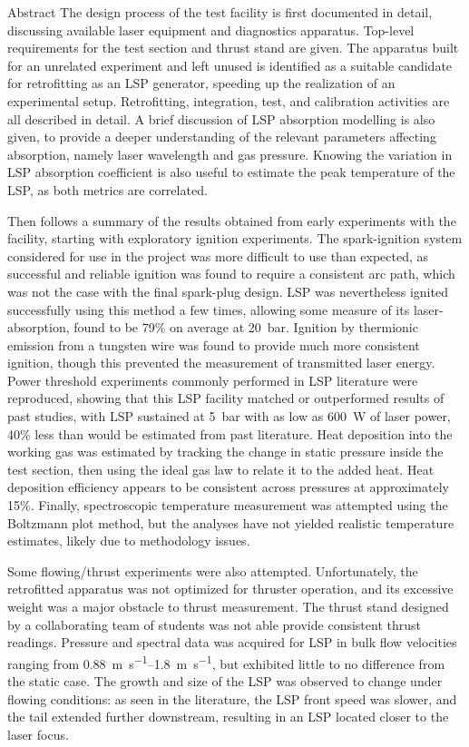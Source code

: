 \begin{plainchp}{Abstract}
    The design process of the test facility is first documented in detail, discussing available laser equipment and diagnostics apparatus. Top-level requirements for the test section and thrust stand are given. The apparatus built for an unrelated experiment and left unused is identified as a suitable candidate for retrofitting as an LSP generator, speeding up the realization of an experimental setup. Retrofitting, integration, test, and calibration activities are all described in detail. A brief discussion of LSP absorption modelling is also given, to provide a deeper understanding of the relevant parameters affecting absorption, namely laser wavelength and gas pressure. Knowing the variation in LSP absorption coefficient is also useful to estimate the peak temperature of the LSP, as both metrics are correlated.

    Then follows a summary of the results obtained from early experiments with the facility, starting with exploratory ignition experiments. The spark-ignition system considered for use in the project was more difficult to use than expected, as successful and reliable ignition was found to require a consistent arc path, which was not the case with the final spark-plug design. LSP was nevertheless ignited successfully using this method a few times, allowing some measure of its laser-absorption, found to be 79\% on average at \qty{20}{bar}. Ignition by thermionic emission from a tungsten wire was found to provide much more consistent ignition, though this prevented the measurement of transmitted laser energy. Power threshold experiments commonly performed in LSP literature were reproduced, showing that this LSP facility matched or outperformed results of past studies, with LSP sustained at \qty{5}{bar} with as low as \qty{600}{W} of laser power, 40\% less than would be estimated from past literature. Heat deposition into the working gas was estimated by tracking the change in static pressure inside the test section, then using the ideal gas law to relate it to the added heat. Heat deposition efficiency appears to be consistent across pressures at approximately 15\%. Finally, spectroscopic temperature measurement was attempted using the Boltzmann plot method, but the analyses have not yielded realistic temperature estimates, likely due to methodology issues.

    Some flowing/thrust experiments were also attempted. Unfortunately, the retrofitted apparatus was not optimized for thruster operation, and its excessive weight was a major obstacle to thrust measurement. The thrust stand designed by a collaborating team of students was not able provide consistent thrust readings. Pressure and spectral data was acquired for LSP in bulk flow velocities ranging from \qtyrange{0.88}{1.8}{m.s^{-1}}, but exhibited little to no difference from the static case. The growth and size of the LSP was observed to change under flowing conditions: as seen in the literature, the LSP front speed was slower, and the tail extended further downstream, resulting in an LSP located closer to the laser focus.


\end{plainchp}
